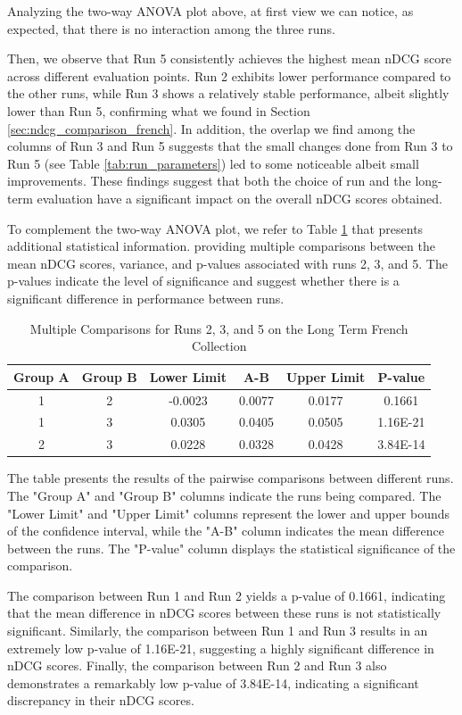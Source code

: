 Analyzing the two-way \ac{ANOVA} plot above, at first view we can notice, as expected, that there is no interaction among the three runs.  

Then, we observe that Run 5 consistently achieves the highest mean \ac{nDCG} score across different evaluation points. 
Run 2 exhibits lower performance compared to the other runs, while Run 3 shows a relatively stable performance, albeit slightly lower than Run 5, confirming what we found in Section \ref{sec:ndcg_comparison_french}.
In addition, the overlap we find among the columns of Run 3 and Run 5 suggests that the small changes done from Run 3 to Run 5 (see Table \ref{tab:run_parameters}) led to some noticeable albeit small improvements. 
These findings suggest that both the choice of run and the long-term evaluation have a significant impact on the overall \ac{nDCG} scores obtained.

To complement the two-way \ac{ANOVA} plot, we refer to Table \ref{table:lt_anova_french} that presents additional statistical information.
providing multiple comparisons between the mean \ac{nDCG} scores, variance, and p-values associated with runs 2, 3, and 5. 
The p-values indicate the level of significance and suggest whether there is a significant difference in performance between runs. 

\begin{table}[!h]
\centering
\caption{Multiple Comparisons for Runs 2, 3, and 5 on the Long Term French Collection}
\label{table:lt_anova_french}
\begin{tabular}{cccccc}
\hline
Group A & Group B & Lower Limit & A-B & Upper Limit & P-value \\ \hline
1 & 2 & -0.0023 & 0.0077 & 0.0177 & 0.1661 \\
1 & 3 & 0.0305 & 0.0405 & 0.0505 & 1.16E-21 \\
2 & 3 & 0.0228 & 0.0328 & 0.0428 & 3.84E-14 \\ \hline
\end{tabular}
\end{table}

The table presents the results of the pairwise comparisons between different runs. 
The "Group A" and "Group B" columns indicate the runs being compared. 
The "Lower Limit" and "Upper Limit" columns represent the lower and upper bounds of the confidence interval, while the "A-B" column indicates the mean difference between the runs. 
The "P-value" column displays the statistical significance of the comparison.

The comparison between Run 1 and Run 2 yields a p-value of 0.1661, indicating that the mean difference in \ac{nDCG} scores between these runs is not statistically significant. Similarly, the comparison between Run 1 and Run 3 results in an extremely low p-value of 1.16E-21, suggesting a highly significant difference in \ac{nDCG} scores. Finally, the comparison between Run 2 and Run 3 also demonstrates a remarkably low p-value of 3.84E-14, indicating a significant discrepancy in their \ac{nDCG} scores.

